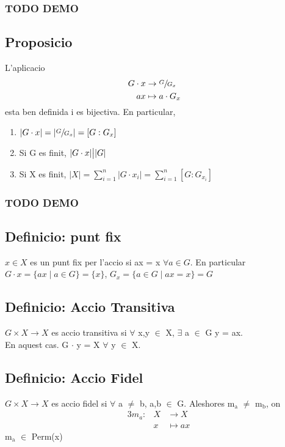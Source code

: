\documentclass[11pt]{article}
\begin{document}
\subsubsection{{\bfseries\sffamily TODO} DEMO}
\label{sec:org0682b28}

\subsection{Proposicio}
\label{sec:orgd060727}
L'aplicacio
\begin{alignat*}{3}
G \cdot x &\to \sfrac{G}{G_x}& \\
ax &\mapsto a\cdot G_x&
\end{alignat*}
esta ben definida i es bijectiva. En particular, \\
\begin{enumerate}
\item \(\lvert G \cdot x \rvert = \lvert \sfrac{G}{G_x} \rvert = [G:G_x]\)
\item Si G es finit, \(\lvert G \cdot x \rvert \big{|} \lvert G \rvert\)
\item Si X es finit, \(\lvert X \rvert = \sum_{i=1}^{n} \lvert G \cdot x_i \rvert = \sum_{i=1}^n [G:G_{x_i}]\)
\end{enumerate}
\subsubsection{{\bfseries\sffamily TODO} DEMO}
\label{sec:org0a3fea7}

\subsection{Definicio: punt fix}
\label{sec:orgc94a7ae}
\(x \in X\) es un punt fix per l'accio si ax = x \(\forall a \in G\). En particular\\
\(G \cdot x = \{ax \mid a \in G\} = \{x\}\), \(G_x = \{ a \in G \mid ax = x \} = G\)

\subsection{Definicio: Accio Transitiva}
\label{sec:org8bfd57c}
\(G \times X \to X\) es accio transitiva si \(\forall\) x,y \(\in\) X, \(\exists\) a \(\in\) G  y = ax. \\
En aquest cas. G \(\cdot\) y = X \(\forall\) \quad y \(\in\) X.

\subsection{Definicio: Accio Fidel}
\label{sec:org6174f91}
\(G \times X \to X\) es accio fidel si \(\forall\) a \(\neq\) b, a,b \(\in\) G. Aleshores m\(_{\text{a}}\) \(\neq\) m\(_{\text{b}}\), on
\begin{alignat*}{3}
m_a: &X &\to X \\
&x &\mapsto ax
\end{alignat*}
m\(_{\text{a}}\) \(\in\) Perm(x)
\end{document}
